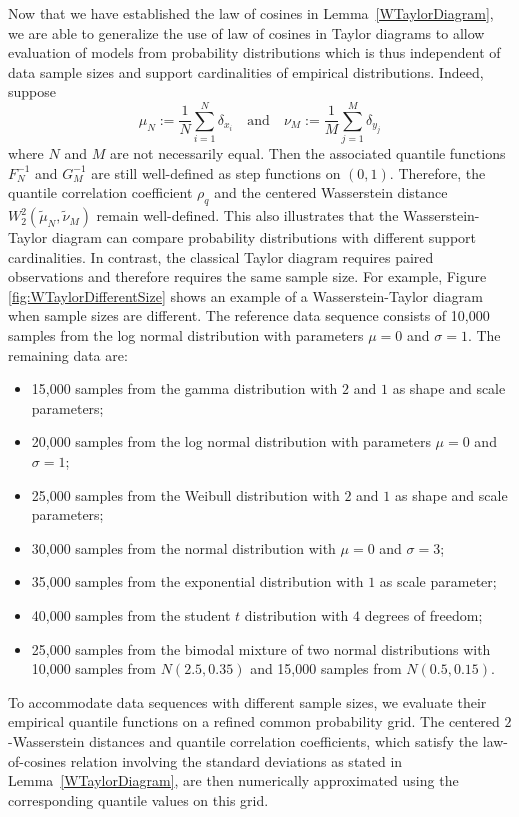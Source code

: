 \documentclass{amsart}
\numberwithin{equation}{section}
\theoremstyle{plain}
\theoremstyle{definition}
\begin{document}
Now that we have established the law of cosines in Lemma~\ref{WTaylorDiagram}, we are able to generalize the use of law of cosines in Taylor diagrams to allow evaluation of models from probability distributions which is thus independent of data sample sizes and support cardinalities of empirical distributions. 
Indeed, suppose
\[
\mu_N := \frac1N \sum\limits_{i=1}^N \delta_{x_i} \quad \textrm{and} \quad \nu_M := \frac1M \sum\limits_{j=1}^M \delta_{y_j}
\]
where $N$ and $M$ are not necessarily equal. 
Then the associated  quantile functions $F_N^{-1}$ and $G_M^{-1}$
are still well-defined as step functions on $(0,1)$. 
Therefore, the quantile correlation coefficient $\rho_q$ and the centered Wasserstein distance $W_2^2(\widetilde{\mu}_N,\widetilde{\nu}_M)$
remain well-defined. 
This also illustrates that the Wasserstein-Taylor diagram can compare probability distributions with  different support cardinalities. In contrast, the classical Taylor diagram requires paired observations and therefore requires the same sample size. 
For example, Figure \ref{fig:WTaylorDifferentSize} shows an example of a Wasserstein-Taylor diagram when sample sizes are different. 
The reference data sequence consists of 10,000 samples from the log normal distribution with parameters $\mu =0$ and $\sigma =1$. The remaining data are: 
\begin{itemize}
    \item[$(1)$] 15,000 samples from the gamma distribution with $2$ and $1$ as shape and scale parameters; 
    \item[$(2)$] 20,000 samples from the log normal distribution with parameters $\mu=0$ and $\sigma =1$;  
    \item [$(3)$]  25,000 samples from the Weibull distribution with $2$ and $1$ as shape and scale parameters; 
    \item [$(4)$] 30,000 samples from the normal distribution with $\mu=0$ and $\sigma =3$;
    \item [$(5)$] 35,000 samples from the exponential distribution with $1$ as scale parameter;
    \item [$(6)$] 40,000 samples from the student $t$ distribution with $4$ degrees of freedom;
    \item [$(7)$] 25,000 samples from the bimodal mixture of two normal distributions with 10,000 samples from $N(2.5, 0.35)$ and 15,000 samples from $N(0.5, 0.15)$.
\end{itemize}


To accommodate data sequences with different sample sizes, we evaluate their empirical quantile functions on a refined common probability grid. The centered $2$-Wasserstein distances and quantile correlation coefficients, which satisfy the law-of-cosines relation involving the standard deviations as stated in Lemma~\ref{WTaylorDiagram}, are then numerically approximated using the corresponding quantile values on this grid.
\end{document}
